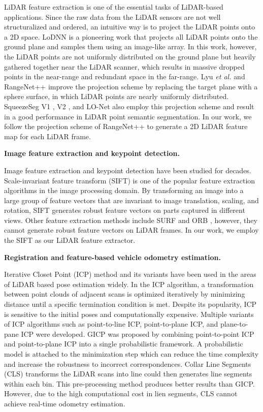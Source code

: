 \documentclass[sigconf]{acmart}
\def\etal{\emph{et al. }}
\newcommand{\bfsection}[1]{\vspace*{0.1cm}\noindent\textbf{#1.}}
\begin{document}
LiDAR feature extraction is one of the essential tasks of LiDAR-based applications. Since the raw data from the LiDAR sensors are not well structuralized and ordered, an intuitive way is to project the LiDAR points onto a 2D space. LoDNN \cite{caltagirone2017Lodnn} is a pioneering work that projects all LiDAR points onto the ground plane and samples them using an image-like array. In this work, however, the LiDAR points are not uniformly distributed on the ground plane but heavily gathered together near the LiDAR scanner, which results in massive dropped points in the near-range and redundant space in the far-range. Lyu \etal{} \cite{lyu2018real,lyu2018chipnet} and RangeNet++ \cite{milioto2019rangenet++} improve the projection scheme by replacing the target plane with a sphere surface, in which LiDAR points are nearly uniformly distributed. SqueezeSeg V1 \cite{wu2018squeezeseg}, V2 \cite{wu2019squeezesegv2}, and LO-Net \cite{LO-Net} also employ this projection scheme and result in a good performance in LiDAR point semantic segmentation. In our work, we follow the projection scheme of RangeNet++ to generate a 2D LiDAR feature map for each LiDAR frame.

\bfsection{Image feature extraction and keypoint detection}

Image feature extraction and keypoint detection have been studied for decades. Scale-invariant feature transform (SIFT) \cite{lowe1999sift} is one of the popular feature extraction algorithms in the image processing domain. By transforming an image into a large group of feature vectors that are invariant to image translation, scaling, and rotation, SIFT generates robust feature vectors on parts captured in different views. Other feature extraction methods include SURF \cite{bay2006surf} and ORB \cite{rublee2011orb}, however, they cannot generate robust feature vectors on LiDAR frames. In our work, we employ the SIFT as our LiDAR feature extractor.

\bfsection{Registration and feature-based vehicle odometry estimation}

Iterative Closet Point (ICP)\cite{ICP} method and its variants\cite{ICP_variants}\cite{ICP_variants1}\cite{ICP_variants2} have been used in the areas of LiDAR based pose estimation widely. In the ICP algorithm, a transformation between point clouds of adjacent scans is optimized iteratively by minimizing distance until a specific termination condition is met. Despite its popularity, ICP is sensitive to the initial poses and computationally expensive. Multiple variants of ICP algorithms such as point-to-line ICP\cite{ICP_l}, point-to-plane ICP\cite{ICP_p2plane}, and plane-to-pane ICP\cite{ICP_variants} were developed. GICP\cite{GICP} was proposed by combining point-to-point ICP and point-to-plane ICP into a single probabilistic framework. A probabilistic model is attached to the minimization step which can reduce the time complexity and increase the robustness to incorrect correspondences. Collar Line Segments (CLS)\cite{CLS} transforms the LiDAR scans into line could then generates line segments within each bin. This pre-processing method produces better results than GICP. However, due to the high computational cost in lien segments, CLS cannot achieve real-time odometry estimation. 
\end{document}
